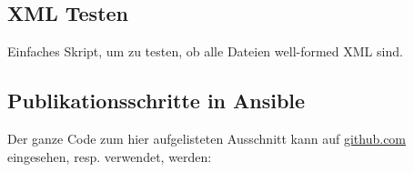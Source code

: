\subsection{XML Testen}
Einfaches Skript, um zu testen, ob alle Dateien well-formed XML sind.

\subsection{Publikationsschritte in Ansible}
Der ganze Code zum hier aufgelisteten Ausschnitt kann auf \href{https://github.com/bfh-semesterarbeit/spot-geoprocessing}{github.com} eingesehen, resp. verwendet, werden:


